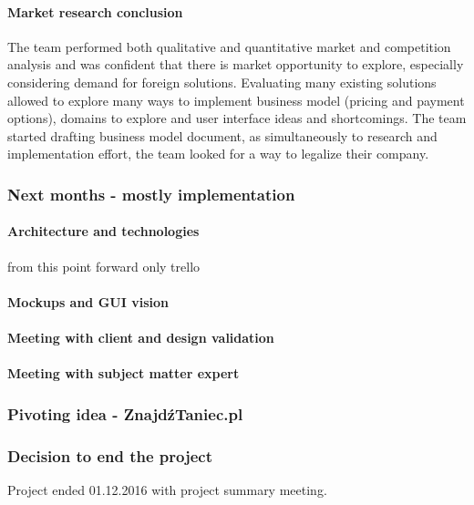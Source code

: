 \documentclass{article}
\begin{document}
\paragraph{Market research conclusion}
The team performed both qualitative and quantitative market and competition analysis and was confident that there is market opportunity to explore, especially considering demand for foreign solutions. Evaluating many existing solutions allowed to explore many ways to implement business model (pricing and payment options), domains to explore and user interface ideas and shortcomings. The team started drafting business model document, as simultaneously to research and implementation effort, the team looked for a way to legalize their company.

\subsubsection{Next months - mostly implementation}

\paragraph{Architecture and technologies}


from this point forward only trello

\paragraph{Mockups and GUI vision}


\paragraph{Meeting with client and design validation}

\paragraph{Meeting with subject matter expert}

\subsubsection{Pivoting idea - ZnajdźTaniec.pl}

\subsubsection{Decision to end the project}
Project ended 01.12.2016 with project summary meeting.
\end{document}
